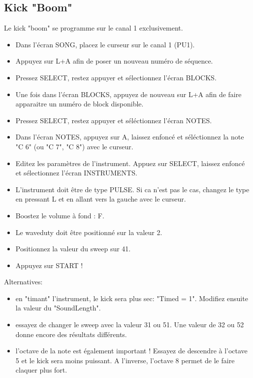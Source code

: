 \documentclass[12pt,a4paper]{article}
\begin{document}
    \subsection{Kick "Boom"}
    
    Le kick "boom" se programme sur le canal 1 exclusivement.    
    
    \begin{itemize}
    \item{Dans l'écran SONG, placez le curseur sur le canal 1 (PU1).}    
    \item{Appuyez sur L+A afin de poser un nouveau numéro de séquence.}
    \item{Pressez SELECT, restez appuyer et sélectionnez l'écran BLOCKS.}
    \item{Une fois dans l'écran BLOCKS, appuyez de nouveau sur L+A afin de faire apparaitre un numéro de block disponible.}
    \item{Pressez SELECT, restez appuyer et séléctionnez l'écran NOTES.}
    \item{Dans l'écran NOTES, appuyez sur A, laissez enfoncé et séléctionnez la note "C 6" (ou "C 7", "C 8") avec le curseur.}
    \item{Editez les paramètres de l'instrument. Appuez sur SELECT, laissez enfoncé et sélectionnez l'écran INSTRUMENTS.}
    \item{L'instrument doit être de type PULSE. Si ca n'est pas le cas, changez le type en pressant L et en allant vers la gauche avec le curseur.}
    \item{Boostez le volume à fond : F.}
    \item{Le waveduty doit être positionné sur la valeur 2.}
    \item{Positionnez la valeur du sweep sur 41.}
    \item{Appuyez sur START !}
    \end{itemize}\medskip
    
    Alternatives:
    \begin{itemize}
    \item{en "timant" l'instrument, le kick sera plus sec: "Timed = 1". Modifiez ensuite la valeur du "SoundLength".}
    \item{essayez de changer le sweep avec la valeur 31 ou 51. Une valeur de 32 ou 52 donne encore des résultats différents.}
    \item{l'octave de la note est également important ! Essayez de descendre à l'octave 5 et le kick sera moins puissant. A l'inverse, l'octave 8 permet de le faire claquer plus fort.}
    \end{itemize}\medskip
    
\end{document}
